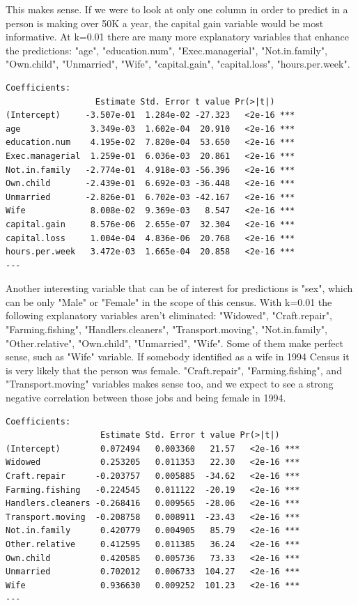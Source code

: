 \documentclass[letter]{article}
\begin{document}
This makes sense. If we were to look at only one column in order to predict in a person is making over 50K a year, the capital gain variable would be most informative. At k=0.01 there are many more explanatory variables that enhance the predictions:  "age", "education.num", "Exec.managerial", "Not.in.family", "Own.child", "Unmarried", "Wife", "capital.gain", "capital.loss", "hours.per.week".

\begin{verbatim}
Coefficients:
                  Estimate Std. Error t value Pr(>|t|)    
(Intercept)     -3.507e-01  1.284e-02 -27.323   <2e-16 ***
age              3.349e-03  1.602e-04  20.910   <2e-16 ***
education.num    4.195e-02  7.820e-04  53.650   <2e-16 ***
Exec.managerial  1.259e-01  6.036e-03  20.861   <2e-16 ***
Not.in.family   -2.774e-01  4.918e-03 -56.396   <2e-16 ***
Own.child       -2.439e-01  6.692e-03 -36.448   <2e-16 ***
Unmarried       -2.826e-01  6.702e-03 -42.167   <2e-16 ***
Wife             8.008e-02  9.369e-03   8.547   <2e-16 ***
capital.gain     8.576e-06  2.655e-07  32.304   <2e-16 ***
capital.loss     1.004e-04  4.836e-06  20.768   <2e-16 ***
hours.per.week   3.472e-03  1.665e-04  20.858   <2e-16 ***
---
\end{verbatim}

Another interesting variable that can be of interest for predictions is "sex", which can be only "Male" or "Female" in the scope of this census. With k=0.01 the following explanatory variables aren't eliminated: "Widowed", "Craft.repair", "Farming.fishing", "Handlers.cleaners", "Transport.moving", "Not.in.family", "Other.relative", "Own.child", "Unmarried", "Wife". Some of them make perfect sense, such as "Wife" variable. If somebody identified as a wife in 1994 Census it is very likely that the person was female. "Craft.repair", "Farming.fishing", and  "Transport.moving" variables makes sense too, and we expect to see a strong negative correlation between those jobs and being female in 1994.

\begin{verbatim}
Coefficients:
                   Estimate Std. Error t value Pr(>|t|)    
(Intercept)        0.072494   0.003360   21.57   <2e-16 ***
Widowed            0.253205   0.011353   22.30   <2e-16 ***
Craft.repair      -0.203757   0.005885  -34.62   <2e-16 ***
Farming.fishing   -0.224545   0.011122  -20.19   <2e-16 ***
Handlers.cleaners -0.268416   0.009565  -28.06   <2e-16 ***
Transport.moving  -0.208758   0.008911  -23.43   <2e-16 ***
Not.in.family      0.420779   0.004905   85.79   <2e-16 ***
Other.relative     0.412595   0.011385   36.24   <2e-16 ***
Own.child          0.420585   0.005736   73.33   <2e-16 ***
Unmarried          0.702012   0.006733  104.27   <2e-16 ***
Wife               0.936630   0.009252  101.23   <2e-16 ***
---

\end{verbatim}
\end{document}
